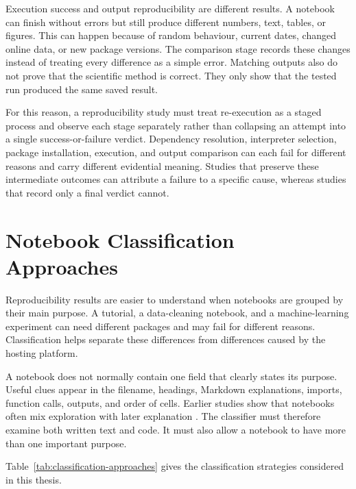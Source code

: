 Execution success and output reproducibility are different results. A notebook can finish without errors but still produce different numbers, text, tables, or figures. This can happen because of random behaviour, current dates, changed online data, or new package versions. The comparison stage records these changes instead of treating every difference as a simple error. Matching outputs also do not prove that the scientific method is correct. They only show that the tested run produced the same saved result.

For this reason, a reproducibility study must treat re-execution as a staged process and observe each stage separately rather than collapsing an attempt into a single success-or-failure verdict. Dependency resolution, interpreter selection, package installation, execution, and output comparison can each fail for different reasons and carry different evidential meaning. Studies that preserve these intermediate outcomes \cite{pimentel2019,samuel2024computational} can attribute a failure to a specific cause, whereas studies that record only a final verdict cannot.

\clearpage
\section{Notebook Classification Approaches}

Reproducibility results are easier to understand when notebooks are grouped by their main purpose. A tutorial, a data-cleaning notebook, and a machine-learning experiment can need different packages and may fail for different reasons. Classification helps separate these differences from differences caused by the hosting platform.

A notebook does not normally contain one field that clearly states its purpose. Useful clues appear in the filename, headings, Markdown explanations, imports, function calls, outputs, and order of cells. Earlier studies show that notebooks often mix exploration with later explanation \cite{rule2018,kery2018}. The classifier must therefore examine both written text and code. It must also allow a notebook to have more than one important purpose.

Table~\ref{tab:classification-approaches} gives the classification strategies considered in this thesis.

